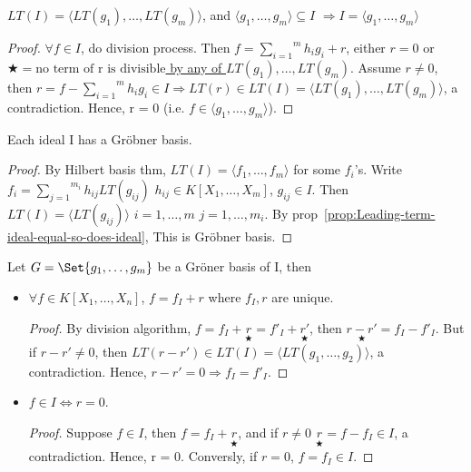 \begin{prop} \label{prop:Leading-term-ideal-equal-so-does-ideal}
  $LT(I) = \langle LT(g_1),\dots,LT(g_m) \rangle$, and $\langle g_1,\dots,g_m \rangle \subseteq I$ $ \Rightarrow I = \langle g_1,\dots,g_m \rangle$
  \begin{proof}
    $\forall f \in I$, do division process. Then $f = \overset{m}{\underset{i = 1}{\sum}} h_ig_i+r$, either $r=0$ or \uline{$\bigstar = \text{no term of r is divisible}$ by any of $LT(g_1),\dots,LT(g_m)$}. Assume $r \neq 0$, then $r = f - \overset{m}{\underset{i = 1}{\sum}} h_i g_i \in I \Rightarrow LT(r) \in LT(I) = \langle LT(g_1),\dots, LT(g_m) \rangle$, a contradiction. Hence, r = 0 (i.e. $f\in \langle g_1,\dots,g_m \rangle$).
  \end{proof}
\end{prop}

\begin{theorem} \label{thm:Grobner_existense}
  Each ideal I has a Gr\"{o}bner basis.
  \begin{proof}
    By Hilbert basis thm, $LT(I) = \langle f_1,\dots,f_m \rangle$ for some $f_i$'s. Write $f_i = \overset{m_i}{\underset{j = 1}{\sum}}h_{ij}LT(g_{ij})$ $h_{ij} \in K[X_1,\dots,X_m]$, $g_{ij} \in I$. Then $LT(I) = \langle LT(g_{ij}) \rangle$ $i=1,\dots,m$ $j=1,\dots,m_i$. By prop~\ref{prop:Leading-term-ideal-equal-so-does-ideal}, This is Gr\"{o}bner basis.
  \end{proof}
\end{theorem}

\begin{theorem} \label{thm:Grobner_property}
  Let $G = \Set{g_1,\dots,g_m}$ be a Gr\"{o}ner basis of I, then
  \begin{itemize}
    \item $\forall f \in K[X_1,\dots,X_n]$, $f = f_I + r$ where $f_I,r$ are unique.
      \begin{proof}
        By division algorithm, $f = f_I +\underset{\bigstar}{r} = f'_I+\underset{\bigstar}{r'}$, then $\underset{\bigstar}{r-r'} = f_I-f'_I$. But if $r-r' \neq 0$, then $LT(r-r') \in LT(I) = \langle LT(g_1,\dots,g_2) \rangle$, a contradiction. Hence, $r-r' = 0\Rightarrow f_I = f'_I$.
      \end{proof}
    \item $f \in I \iff r=0$.
      \begin{proof}
        Suppose $f \in I$, then $f = f_I + \underset{\bigstar}{r}$, and if $r\neq 0$ $\underset{\bigstar}{r} = f - f_I\in I$, a contradiction. Hence, r = 0. Conversly, if $r = 0$, $f = f_I \in I$. 
      \end{proof}
  \end{itemize}
\end{theorem}


